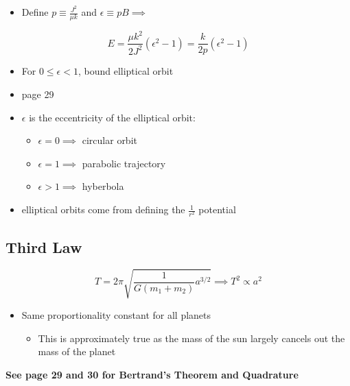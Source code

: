 \documentclass[a4paper,11pt,normalem]{article}
\begin{document}
\begin{itemize}
\item
  Define \(p \equiv \frac{J^2}{\mu k}\) and
  \(\epsilon \equiv pB \implies\)
\end{itemize}

\[
    E = \frac{\mu k^2}{2J^2}(\epsilon^2 - 1) = \frac{k}{2p}(\epsilon^2 - 1)
\]

\begin{itemize}
\item
  For \(0 \leq \epsilon < 1\), bound elliptical orbit
\item
  page 29
\item
  \(\epsilon\) is the eccentricity of the elliptical orbit:
  \begin{itemize}
  \item
    \(\epsilon = 0 \implies\) circular orbit
  \item
    \(\epsilon = 1 \implies\) parabolic trajectory
  \item
    \(\epsilon > 1 \implies\) hyberbola
  \end{itemize}
\item
  elliptical orbits come from defining the \(\frac{1}{r^2}\) potential
\end{itemize}

\subsection{Third Law}\label{third-law}

\[
    T = 2\pi \sqrt{\frac{1}{G(m_1 + m_2)}a^{3/2}} \implies T^2 \propto a^2
\]

\begin{itemize}
\item
  Same proportionality constant for all planets
  \begin{itemize}
  \item
    This is approximately true as the mass of the sun largely cancels
    out the mass of the planet
  \end{itemize}
\end{itemize}

\textbf{See page 29 and 30 for Bertrand's Theorem and Quadrature}
\end{document}
